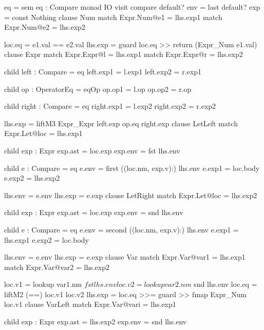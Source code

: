 \begin{code}
{
eq = sem eq : Compare monad IO
       visit compare
         default? env = last
         default? exp = const Nothing
         clause Num
           match Expr.Num@e1 = lhs.exp1
           match Expr.Num@e2 = lhs.exp2
           
           loc.eq  = e1.val == e2.val
           lhs.exp = guard loc.eq >> return (Expr_Num e1.val)
         clause Expr
           match Expr.Expr@l = lhs.exp1
           match Expr.Expr@r = lhs.exp2
           
           child left : Compare = eq
           left.exp1 = l.exp1
           left.exp2 = r.exp1
           
           child op : OperatorEq = eqOp
           op.op1 = l.op
           op.op2 = r.op
           
           child right : Compare = eq
           right.exp1 = l.exp2
           right.exp2 = r.exp2
           
           lhs.exp = liftM3 Expr_Expr left.exp op.eq right.exp
         clause LetLeft
           match Expr.Let@loc  = lhs.exp1
           
           child exp : Expr
           exp.ast = loc.exp
           exp.env = fst lhs.env
           
           child e : Compare = eq
           e.env  = first ((loc.nm, exp.v):) lhs.env
           e.exp1 = loc.body
           e.exp2 = lhs.exp2
           
           lhs.env = e.env
           lhs.exp = e.exp
         clause LetRight
           match Expr.Let@loc  = lhs.exp2
           
           child exp : Expr
           exp.ast = loc.exp
           exp.env = snd lhs.env
           
           child e : Compare = eq
           e.env  = second ((loc.nm, exp.v):) lhs.env
           e.exp1 = lhs.exp1
           e.exp2 = loc.body
           
           lhs.env = e.env
           lhs.exp = e.exp
         clause Var
           match Expr.Var@var1 = lhs.exp1
           match Expr.Var@var2 = lhs.exp2
           
           loc.v1  = lookup var1.nm $ fst lhs.env
           loc.v2  = lookup var2.nm $ snd lhs.env
           loc.eq  = liftM2 (==) loc.v1 loc.v2
           lhs.exp = loc.eq >>= guard >> fmap Expr_Num loc.v1
         clause VarLeft
           match Expr.Var@vari = lhs.exp1
           
           child exp : Expr
           exp.ast = lhs.exp2
           exp.env = snd lhs.env
           
}
\end{code}
